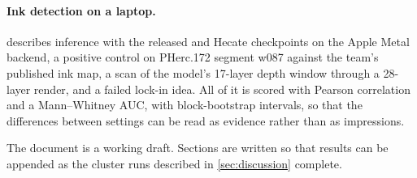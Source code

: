 \paragraph{Ink detection on a laptop.}  describes inference with the released  and Hecate checkpoints on the Apple Metal backend, a positive control on PHerc.172 segment w087 against the team's published ink map, a scan of the model's 17-layer depth window through a 28-layer render, and a failed lock-in idea. All of it is scored with Pearson correlation and a Mann--Whitney AUC, with block-bootstrap intervals, so that the differences between settings can be read as evidence rather than as impressions.

The document is a working draft. Sections are written so that results can be appended as the cluster runs described in \cref{sec:discussion} complete.
